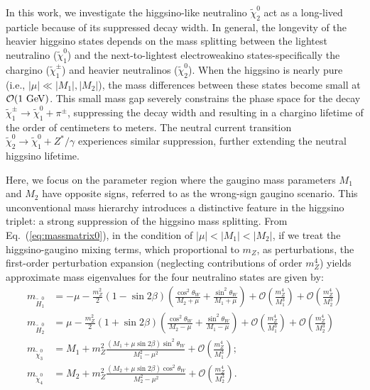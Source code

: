 \documentclass[letterpaper,11pt]{article}
\def\to{\rightarrow}
\begin{document}
\par In this work, we investigate the higgsino-like neutralino $\tilde{\chi}_2^0$ act as a long-lived particle because of its suppressed decay width. In general, the longevity of the heavier higgsino states depends on the mass splitting between the lightest neutralino ($\tilde{\chi}^0_1$) and the next-to-lightest electroweakino states-specifically the chargino ($\tilde{\chi}^\pm_1$) and heavier neutralinos ($\tilde{\chi}^0_2$). When the higgsino is nearly pure (i.e., $|\mu| \ll |M_1|, |M_2|$), the mass differences between these states become small at $\mathcal{O}(1~{\rm GeV})$. This small mass gap severely constrains the phase space for the decay $\tilde{\chi}^\pm_1 \to \tilde{\chi}^0_1 + \pi^\pm$, suppressing the decay width and resulting in a chargino lifetime of the order of centimeters to meters. The neutral current transition $\tilde{\chi}^0_2 \to \tilde{\chi}^0_1 + Z^* / \gamma$ experiences similar suppression, further extending the neutral higgsino lifetime. 
\par Here, we focus on the parameter region where the gaugino mass parameters  $M_1$  and  $M_2$  have opposite signs, referred to as the wrong-sign gaugino scenario. This unconventional mass hierarchy introduces a distinctive feature in the higgsino triplet: a strong suppression of the higgsino mass splitting. From Eq.~(\ref{eq:massmatrix0}), in the condition of $|\mu| < |M_1| < |M_2|$, if we treat the higgsino-gaugino mixing terms, which proportional to $m_Z$, as perturbations, the first-order perturbation expansion (neglecting contributions of order $m_Z^4$) yields approximate mass eigenvalues for the four neutralino states are given by:   
\begin{equation}\label{eq:mnue}
\begin{split}
m_{\tilde{H}_1^0} &= 	-\mu - \frac{m_Z^2}{2}\left(1 - \sin{2\beta} \right) \left(
\frac{\cos^2{\theta_W}}{ M_2 + \mu } + \frac{ \sin^2{\theta_W} }{ M_1 + \mu } \right) 
+ \mathcal{O} (\frac{m_Z^4}{M_1^3}) + \mathcal{O} (\frac{m_Z^4}{M_2^3})  \\
m_{\tilde{H}_2^0} &=  	\mu - \frac{m_Z^2}{2}(1 + \sin{2\beta})  \left(
\frac{\cos^2{\theta_W}}{ M_2 - \mu} + \frac{\sin^2{\theta_W}}{ M_1 - \mu} \right) 
+ \mathcal{O} (\frac{m_Z^4}{M_1^3}) + \mathcal{O} (\frac{m_Z^4}{M_2^3})
 \\
m_{\tilde{\chi}_3^0} &=  M_1 + m_Z^2
\frac{ (M_1 + \mu \sin 2\beta) \sin^2\theta_W}{M_1^2 - \mu^2} 
+ \mathcal{O} (\frac{m_Z^4}{M_1^3});  \\
m_{\tilde{\chi}_4^0} &=  M_2 + m_Z^2
\frac{  (M_2 + \mu\sin{2\beta}) \cos^2{\theta_W}}{M_2^2-\mu^2} +\mathcal{O} (\frac{m_Z^4}{M_2^3}). 
\end{split}\end{equation}
\end{document}
